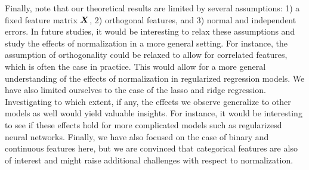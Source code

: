 Finally, note that our theoretical results are limited by several assumptions: 1) a fixed
feature matrix \(\boldsymbol{X}\), 2) orthogonal features, and 3) normal and independent errors.
In future studies, it would be interesting to relax these assumptions and study the effects
of normalization in a more general setting. For instance, the assumption of orthogonality
could be relaxed to allow for correlated features, which is often the case in practice.
This would allow for a more general understanding of the effects of normalization in
regularized regression models. We have also limited ourselves to the case of the lasso and
ridge regression. Investigating to which extent, if any, the effects we observe generalize
to other models as well would yield valuable insights. For instance, it would be
interesting to see if these effects hold for more complicated models such as regularizesd
neural networks. Finally, we have also focused on the case of binary and continuous
features here, but we are convinced that categorical features are also of interest and
might raise additional challenges with respect to normalization.
